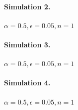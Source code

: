 \documentclass[12pt]{article}
\begin{document}
\begin{figure}[h!]
\end{figure}

\paragraph{Simulation 2.} $\alpha = 0.5, \epsilon = 0.05, n = 1$
\paragraph{Simulation 3.} $\alpha = 0.5, \epsilon = 0.05, n = 1$
\paragraph{Simulation 4.} $\alpha = 0.5, \epsilon = 0.05, n = 1$





\end{document}
